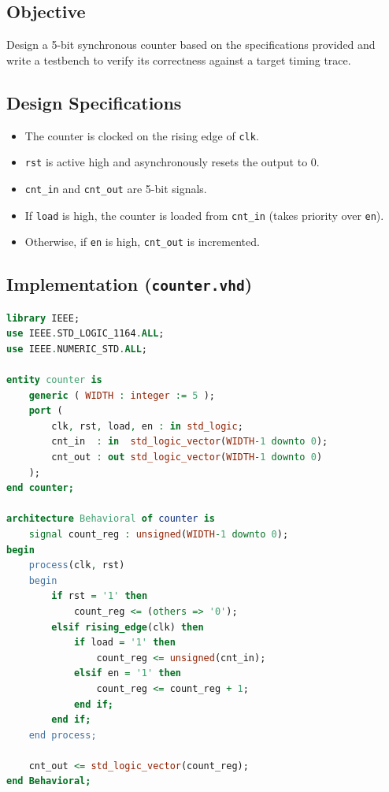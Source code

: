 \documentclass[12pt,a4paper]{article}
\begin{document}
\subsection{Objective}
Design a 5-bit synchronous counter based on the specifications provided and write a testbench to verify its correctness against a target timing trace.

\subsection{Design Specifications}
\begin{itemize}
    \item The counter is clocked on the rising edge of \texttt{clk}.
    \item \texttt{rst} is active high and asynchronously resets the output to 0.
    \item \texttt{cnt\_in} and \texttt{cnt\_out} are 5-bit signals.
    \item If \texttt{load} is high, the counter is loaded from \texttt{cnt\_in} (takes priority over \texttt{en}).
    \item Otherwise, if \texttt{en} is high, \texttt{cnt\_out} is incremented.
\end{itemize}

\subsection{Implementation (\texttt{counter.vhd})}
\begin{lstlisting}[language=VHDL]
library IEEE;
use IEEE.STD_LOGIC_1164.ALL;
use IEEE.NUMERIC_STD.ALL;

entity counter is
    generic ( WIDTH : integer := 5 );
    port (
        clk, rst, load, en : in std_logic;
        cnt_in  : in  std_logic_vector(WIDTH-1 downto 0);
        cnt_out : out std_logic_vector(WIDTH-1 downto 0)
    );
end counter;

architecture Behavioral of counter is
    signal count_reg : unsigned(WIDTH-1 downto 0);
begin
    process(clk, rst)
    begin
        if rst = '1' then
            count_reg <= (others => '0');
        elsif rising_edge(clk) then
            if load = '1' then
                count_reg <= unsigned(cnt_in);
            elsif en = '1' then
                count_reg <= count_reg + 1;
            end if;
        end if;
    end process;
    
    cnt_out <= std_logic_vector(count_reg);
end Behavioral;
\end{lstlisting}
\end{document}
